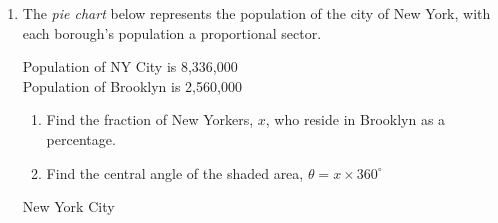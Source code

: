 \documentclass[12pt, twoside]{article}
\begin{document}
\begin{enumerate}
\newpage
\item The \emph{pie chart} below represents the population of the city of New York, with each borough's population a proportional sector.
  \begin{multicols}{2}
  \raggedcolumns
  Population of NY City is 8,336,000\\
Population of Brooklyn is 2,560,000
  \begin{enumerate}%
    \item Find the fraction of New Yorkers, $x$, who reside in Brooklyn as a percentage. \vspace{2cm}
    \item Find the central angle of the shaded area, $\theta = x \times 360^\circ$
  \end{enumerate}
  \columnbreak
  \begin{flushright}
    New York City
  
  \end{flushright}
  \end{multicols}


\end{enumerate}
\end{document}
